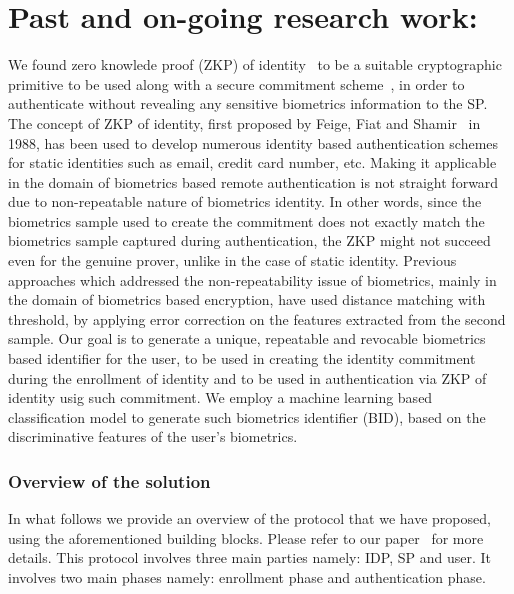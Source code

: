 \documentclass[10pt]{article}
\begin{document}
\section{Past and on-going research work:}
We found zero knowlede proof (ZKP) of identity~\cite{fiat-shamir} to be a suitable cryptographic primitive to be used along with a secure commitment 
scheme~\cite{pedersenCommitment}, in order to authenticate without revealing any sensitive biometrics information to the SP. The concept of ZKP of 
identity, first proposed by Feige, Fiat and Shamir~\cite{fiat-shamir} in 1988, has been used to develop numerous identity based authentication 
schemes~\cite{idemixConcepts, DAA} for static identities such as email, credit card number, etc. Making it applicable in the domain of biometrics 
based remote authentication is not straight forward due to non-repeatable nature of biometrics identity. 
In other words, since the biometrics sample used to create the commitment does not exactly match the biometrics sample captured during 
authentication, the ZKP might not succeed even for the genuine prover, unlike in the case of static identity.
Previous approaches which addressed the non-repeatability issue of biometrics, mainly in the domain of biometrics based encryption, have used 
distance matching with threshold, by applying error correction on the features extracted from the second sample. 
Our goal is to generate a unique, repeatable and revocable biometrics based identifier for the user, to be used in creating the identity 
commitment during the enrollment of identity and to be used in authentication via ZKP of identity usig such commitment. We employ a machine 
learning based classification model to generate such biometrics identifier (BID), based on the discriminative features of the user's biometrics.

\subsubsection*{Overview of the solution}

In what follows we provide an overview of the protocol that we have proposed, using the aforementioned building blocks. Please refer to our 
paper~\cite{ours} for more details. This protocol involves three main parties namely: IDP, SP and user. It involves two main phases namely: 
enrollment phase and authentication phase.\\
\end{document}
